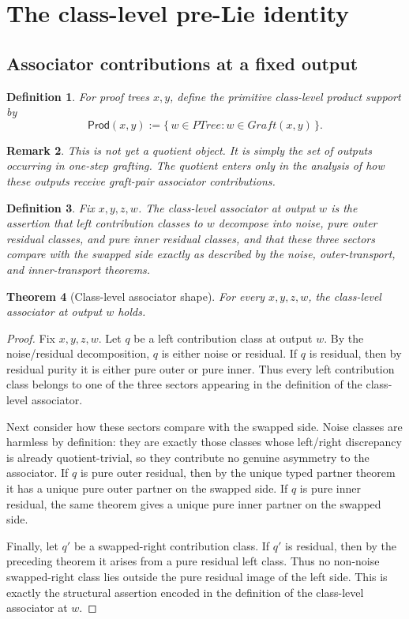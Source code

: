\documentclass[11pt]{article}
\newtheorem{theorem}{Theorem}
\newtheorem{definition}[theorem]{Definition}
\newtheorem{remark}[theorem]{Remark}
\newcommand{\PTree}{\mathit{PTree}}
\newcommand{\Graft}{\mathit{Graft}}
\begin{document}
\section{The class-level pre-Lie identity}

\subsection{Associator contributions at a fixed output}

\begin{definition}
For proof trees \(x,y\), define the \emph{primitive class-level product
support} by
\[
\mathsf{Prod}(x,y) := \{\,w \in \PTree : w\in \Graft(x,y)\,\}.
\]
\end{definition}

\begin{remark}
This is not yet a quotient object. It is simply the set of outputs occurring in
one-step grafting. The quotient enters only in the analysis of how these
outputs receive graft-pair associator contributions.
\end{remark}

\begin{definition}
Fix \(x,y,z,w\). The \emph{class-level associator at output \(w\)} is the
assertion that left contribution classes to \(w\) decompose into noise, pure
outer residual classes, and pure inner residual classes, and that these three
sectors compare with the swapped side exactly as described by the noise,
outer-transport, and inner-transport theorems.
\end{definition}

\begin{theorem}[Class-level associator shape]
For every \(x,y,z,w\), the class-level associator at output \(w\) holds.
\end{theorem}

\begin{proof}
Fix \(x,y,z,w\). Let \(q\) be a left contribution class at output \(w\). By the
noise/residual decomposition, \(q\) is either noise or residual. If \(q\) is
residual, then by residual purity it is either pure outer or pure inner. Thus
every left contribution class belongs to one of the three sectors appearing in
the definition of the class-level associator.

Next consider how these sectors compare with the swapped side. Noise classes
are harmless by definition: they are exactly those classes whose left/right
discrepancy is already quotient-trivial, so they contribute no genuine
asymmetry to the associator. If \(q\) is pure outer residual, then by the
unique typed partner theorem it has a unique pure outer partner on the swapped
side. If \(q\) is pure inner residual, the same theorem gives a unique pure
inner partner on the swapped side.

Finally, let \(q'\) be a swapped-right contribution class. If \(q'\) is
residual, then by the preceding theorem it arises from a pure residual left
class. Thus no non-noise swapped-right class lies outside the pure residual
image of the left side. This is exactly the structural assertion encoded in the
definition of the class-level associator at \(w\).
\end{proof}
\end{document}
